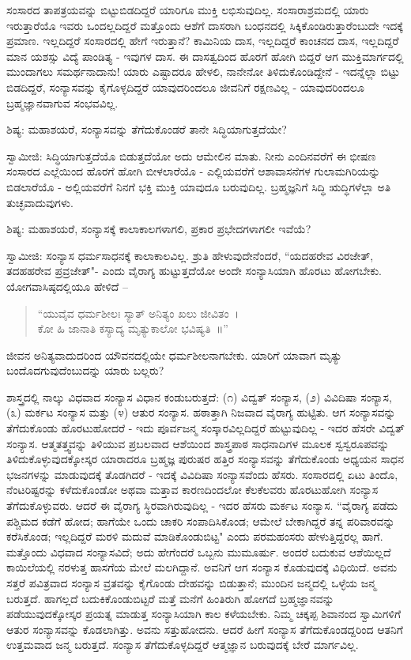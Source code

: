 ಸಂಸಾರದ ತಾಪತ್ರಯವನ್ನು ಬಿಟ್ಟುಬಿಡದಿದ್ದರೆ ಯಾರಿಗೂ ಮುಕ್ತಿ ಲಭಿಸುವುದಿಲ್ಲ. ಸಂಸಾರಾಶ್ರಮದಲ್ಲಿ ಯಾರು ಇರುತ್ತಾರೆಯೊ ಇವರು ಒಂದಲ್ಲದಿದ್ದರೆ ಮತ್ತೊಂದು ಆಶೆಗೆ ದಾಸರಾಗಿ ಬಂಧನದಲ್ಲಿ ಸಿಕ್ಕಿಕೊಂಡಿರುತ್ತಾರೆಂಬುದೇ ಇದಕ್ಕೆ ಪ್ರಮಾಣ. ಇಲ್ಲದಿದ್ದರೆ ಸಂಸಾರದಲ್ಲಿ ಹೇಗೆ ಇರುತ್ತಾನೆ? ಕಾಮಿನಿಯ ದಾಸ, ಇಲ್ಲದಿದ್ದರೆ ಕಾಂಚನದ ದಾಸ, ಇಲ್ಲದಿದ್ದರೆ ಮಾನ ಯಶಸ್ಸು ವಿದ್ಯೆ ಪಾಂಡಿತ್ಯ - ಇವುಗಳ ದಾಸ. ಈ ದಾಸತ್ವದಿಂದ ಹೊರಗೆ ಹೋಗಿ ಬಿದ್ದರೆ ಆಗ ಮುಕ್ತಿಮಾರ್ಗದಲ್ಲಿ ಮುಂದಾಗಲು ಸಮರ್ಥನಾದಾನು! ಯಾರು ಎಷ್ಟಾದರೂ ಹೇಳಲಿ, ನಾನೇನೋ ತಿಳಿದುಕೊಂಡಿದ್ದೇನೆ - ಇದನ್ನೆಲ್ಲಾ ಬಿಟ್ಟು ಬಿಡದಿದ್ದರೆ, ಸಂನ್ಯಾಸವನ್ನು ಕೈಗೊಳ್ಳದಿದ್ದರೆ ಯಾವುದರಿಂದಲೂ ಜೀವನಿಗೆ ರಕ್ಷಣವಿಲ್ಲ - ಯಾವುದರಿಂದಲೂ ಬ್ರಹ್ಮಜ್ಞಾನವಾಗುವ ಸಂಭವವಿಲ್ಲ.

ಶಿಷ್ಯ: ಮಹಾಶಯರೆ, ಸಂನ್ಯಾಸವನ್ನು ತೆಗೆದುಕೊಂಡರೆ ತಾನೇ ಸಿದ್ಧಿಯಾಗುತ್ತದೆಯೇ?

ಸ್ವಾಮೀಜಿ: ಸಿದ್ಧಿಯಾಗುತ್ತದೆಯೊ ಬಿಡುತ್ತದೆಯೋ ಅದು ಆಮೇಲಿನ ಮಾತು. ನೀನು ಎಂದಿನವರೆಗೆ ಈ ಭೀಷಣ ಸಂಸಾರದ ಎಲ್ಲೆಯಿಂದ ಹೊರಗೆ ಹೋಗಿ ಬೀಳಲಾರೆಯೊ - ಎಲ್ಲಿಯವರೆಗೆ ಆಶಾವಾಸನೆಗಳ ಗುಲಾಮಗಿರಿಯನ್ನು ಬಿಡಲಾರೆಯೊ - ಅಲ್ಲಿಯವರೆಗೆ ನಿನಗೆ ಭಕ್ತಿ ಮುಕ್ತಿ ಯಾವುದೂ ಬರುವುದಿಲ್ಲ. ಬ್ರಹ್ಮಜ್ಞನಿಗೆ ಸಿದ್ಧಿ ಋದ್ಧಿಗಳೆಲ್ಲಾ ಅತಿ ತುಚ್ಛವಾದುವುಗಳು.

ಶಿಷ್ಯ: ಮಹಾಶಯರೆ, ಸಂನ್ಯಾಸಕ್ಕೆ ಕಾಲಾಕಾಲಗಳಾಗಲಿ, ಪ್ರಕಾರ ಪ್ರಭೇದಗಳಾಗಲೀ ಇವೆಯೆ?

ಸ್ವಾಮೀಜಿ: ಸಂನ್ಯಾಸ ಧರ್ಮಸಾಧನಕ್ಕೆ ಕಾಲಾಕಾಲವಿಲ್ಲ. ಶ್ರುತಿ ಹೇಳುವುದೇನೆಂದರೆ, “ಯದಹರೇವ ವಿರಜೇತ್, ತದಹಹರೇವ ಪ್ರವ್ರಜೇತ್"- ಎಂದು ವೈರಾಗ್ಯ ಹುಟ್ಟುತ್ತದೆಯೋ ಅಂದೇ ಸಂನ್ಯಾಸಿಯಾಗಿ ಹೊರಟು ಹೋಗಬೇಕು. ಯೋಗವಾಸಿಷ್ಠದಲ್ಲಿಯೂ ಹೇಳಿದೆ –

\begin{verse}
“ಯುವೈವ ಧರ್ಮಶೀಲಃ ಸ್ಯಾತ್ ಅನಿತ್ಯಂ ಖಲು ಜೀವಿತಂ~।\\ಕೋ ಹಿ ಜಾನಾತಿ ಕಸ್ಯಾದ್ಯ ಮೃತ್ಯುಕಾಲೋ ಭವಿಷ್ಯತಿ~॥”
\end{verse}

ಜೀವನ ಅನಿತ್ಯವಾದುದರಿಂದ ಯೌವನದಲ್ಲಿಯೇ ಧರ್ಮಶೀಲನಾಗಬೇಕು. ಯಾರಿಗೆ ಯಾವಾಗ ಮೃತ್ಯು ಬಂದೊದಗುವುದೆಂಬುದನ್ನು ಯಾರು ಬಲ್ಲರು?

ಶಾಸ್ತ್ರದಲ್ಲಿ ನಾಲ್ಕು ವಿಧವಾದ ಸಂನ್ಯಾಸ ವಿಧಾನ ಕಂಡುಬರುತ್ತದೆ: (೧) ವಿದ್ವತ್ ಸಂನ್ಯಾಸ, (೨) ವಿವಿದಿಷಾ ಸಂನ್ಯಾಸ, (೩) ಮರ್ಕಟ ಸಂನ್ಯಾಸ ಮತ್ತು (೪) ಆತುರ ಸಂನ್ಯಾಸ. ಹಠಾತ್ತಾಗಿ ನಿಜವಾದ ವೈರಾಗ್ಯ ಹುಟ್ಟಿತು. ಆಗ ಸಂನ್ಯಾಸವನ್ನು ತೆಗೆದುಕೊಂಡು ಹೊರಟುಹೋದರೆ - ಇದು ಪೂರ್ವಜನ್ಮ ಸಂಸ್ಕಾರವಿಲ್ಲದಿದ್ದರೆ ಹುಟ್ಟುವುದಿಲ್ಲ - ಇದರ ಹೆಸರೇ ವಿದ್ವತ್ ಸಂನ್ಯಾಸ. ಆತ್ಮತತ್ತ್ವವನ್ನು ತಿಳಿಯುವ ಪ್ರಬಲವಾದ ಆಶೆಯಿಂದ ಶಾಸ್ತ್ರಪಾಠ ಸಾಧನಾದಿಗಳ ಮೂಲಕ ಸ್ವಸ್ವರೂಪವನ್ನು ತಿಳಿದುಕೊಳ್ಳುವುದಕ್ಕೋಸ್ಕರ ಯಾರಾದರೂ ಬ್ರಹ್ಮಜ್ಞ ಪುರುಷರ ಹತ್ತಿರ ಸಂನ್ಯಾಸವನ್ನು ತೆಗೆದುಕೊಂಡು ಅಧ್ಯಯನ ಸಾಧನ ಭಜನಗಳನ್ನು ಮಾಡುವುದಕ್ಕೆ ತೊಡಗಿದರೆ - ಇದಕ್ಕೆ ವಿವಿದಿಷಾ ಸಂನ್ಯಾಸವೆಂದು ಹೆಸರು. ಸಂಸಾರದಲ್ಲಿ ಏಟು ತಿಂದೊ, ನೆಂಟರಿಷ್ಟರನ್ನು ಕಳೆದುಕೊಂಡೋ ಅಥವಾ ಮತ್ತಾವ ಕಾರಣದಿಂದಲೋ ಕೆಲಕೆಲವರು ಹೊರಟುಹೋಗಿ ಸಂನ್ಯಾಸ ತೆಗೆದುಕೊಳ್ಳುವರು. ಆದರೆ ಈ ವೈರಾಗ್ಯ ಸ್ಥಿರವಾಗಿರುವುದಿಲ್ಲ - ಇದರ ಹೆಸರು ಮರ್ಕಟ ಸಂನ್ಯಾಸ. “ವೈರಾಗ್ಯ ಪಡೆದು ಪಶ್ಚಿಮದ ಕಡೆಗೆ ಹೋದ; ಹಾಗೆಯೇ ಒಂದು ಚಾಕರಿ ಸಂಪಾದಿಸಿಕೊಂಡ; ಆಮೇಲೆ ಬೇಕಾಗಿದ್ದರೆ ತನ್ನ ಪರಿವಾರವನ್ನು ಕರೆಸಿಕೊಂಡ; ಇಲ್ಲದಿದ್ದರೆ ಮರಳಿ ಮದುವೆ ಮಾಡಿಕೊಂಡುಬಿಟ್ಟ" ಎಂದು ಪರಮಹಂಸರು ಹೇಳುತ್ತಿದ್ದರಲ್ಲ ಹಾಗೆ. ಮತ್ತೊಂದು ವಿಧವಾದ ಸಂನ್ಯಾಸವಿದೆ; ಅದು ಹೇಗೆಂದರೆ ಒಬ್ಬನು ಮುಮೂರ್ಷು. ಅಂದರೆ ಬದುಕುವ ಆಶೆಯಿಲ್ಲದೆ ಕಾಯಿಲೆಯಲ್ಲಿ ನರಳುತ್ತ ಹಾಸಗೆಯ ಮೇಲೆ ಮಲಗಿದ್ದಾನೆ. ಅವನಿಗೆ ಆಗ ಸಂನ್ಯಾಸ ಕೊಡುವುದಕ್ಕೆ ವಿಧಿಯಿದೆ. ಅವನು ಸತ್ತರೆ ಪವಿತ್ರವಾದ ಸಂನ್ಯಾಸ ವ್ರತವನ್ನು ಕೈಗೊಂಡು ದೇಹವನ್ನು ಬಿಡುತ್ತಾನೆ; ಮುಂದಿನ ಜನ್ಮದಲ್ಲಿ ಒಳ್ಳೆಯ ಜನ್ಮ ಬರುತ್ತದೆ. ಹಾಗಲ್ಲದೆ ಬದುಕಿಕೊಂಡುಬಿಟ್ಟರೆ ಮತ್ತೆ ಮನೆಗೆ ಹಿಂತಿರುಗಿ ಹೋಗದೆ ಬ್ರಹ್ಮಜ್ಞಾನವನ್ನು ಪಡೆಯುವುದಕ್ಕೋಸ್ಕರ ಪ್ರಯತ್ನ ಮಾಡುತ್ತ ಸಂನ್ಯಾಸಿಯಾಗಿ ಕಾಲ ಕಳೆಯಬೇಕು. ನಿಮ್ಮ ಚಿಕ್ಕಪ್ಪ ಶಿವಾನಂದ ಸ್ವಾಮಿಗಳಿಗೆ ಆತುರ ಸಂನ್ಯಾಸವನ್ನು ಕೊಡಲಾಗಿತ್ತು. ಅವನು ಸತ್ತುಹೋದನು. ಆದರೆ ಹೀಗೆ ಸಂನ್ಯಾಸ ತೆಗೆದುಕೊಂಡದ್ದರಿಂದ ಆತನಿಗೆ ಉತ್ತಮವಾದ ಜನ್ಮ ಬರುತ್ತದೆ. ಸಂನ್ಯಾಸ ತೆಗೆದುಕೊಳ್ಳದಿದ್ದರೆ ಆತ್ಮಜ್ಞಾನ ಬರುವುದಕ್ಕೆ ಬೇರೆ ಮಾರ್ಗವಿಲ್ಲ.

